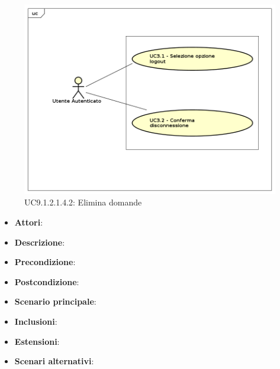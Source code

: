 						\label{UC9.1.2.1.4.2}
						\begin{figure}[h]
							\centering
						\includegraphics[scale=0.7,keepaspectratio]{UML/UC9.png}
							\caption{UC9.1.2.1.4.2: Elimina domande}
						\end{figure}
						\FloatBarrier
						\begin{itemize}
							\item \textbf{Attori}: 
							\item \textbf{Descrizione}: 
							\item \textbf{Precondizione}: 
							\item \textbf{Postcondizione}: 
							\item \textbf{Scenario principale}:
							\item \textbf{Inclusioni}:
							\item \textbf{Estensioni}:
							\item \textbf{Scenari alternativi}:
						\end{itemize}
						
